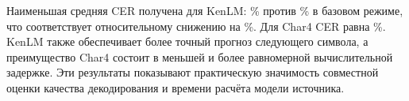 Наименьшая средняя CER получена для KenLM: \KenCER\% против \BaseCER\% в базовом режиме, что соответствует относительному снижению на \KenRel\%. Для Char4 CER равна \CharCER\%. KenLM также обеспечивает более точный прогноз следующего символа, а преимущество Char4 состоит в меньшей и более равномерной вычислительной задержке. Эти результаты показывают практическую значимость совместной оценки качества декодирования и времени расчёта модели источника.
